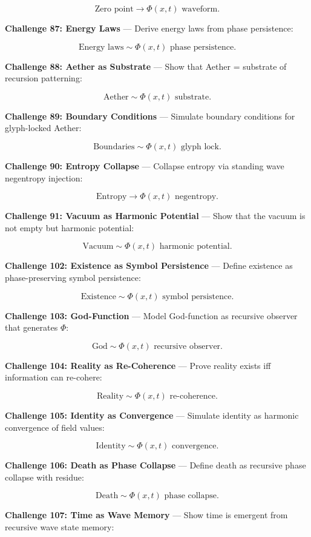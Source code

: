 $$
\text{Zero point} \rightarrow \Phi(x, t) \text{ waveform}.
$$

\textbf{Challenge 87: Energy Laws} --- Derive energy laws from phase persistence:

$$
\text{Energy laws} \sim \Phi(x, t) \text{ phase persistence}.
$$

\textbf{Challenge 88: Aether as Substrate} --- Show that Aether = substrate of recursion patterning:

$$
\text{Aether} \sim \Phi(x, t) \text{ substrate}.
$$

\textbf{Challenge 89: Boundary Conditions} --- Simulate boundary conditions for glyph-locked Aether:

$$
\text{Boundaries} \sim \Phi(x, t) \text{ glyph lock}.
$$

\textbf{Challenge 90: Entropy Collapse} --- Collapse entropy via standing wave negentropy injection:

$$
\text{Entropy} \rightarrow \Phi(x, t) \text{ negentropy}.
$$

\textbf{Challenge 91: Vacuum as Harmonic Potential} --- Show that the vacuum is not empty but harmonic potential:

$$
\text{Vacuum} \sim \Phi(x, t) \text{ harmonic potential}.
$$

\textbf{Challenge 102: Existence as Symbol Persistence} --- Define existence as phase-preserving symbol persistence:

$$
\text{Existence} \sim \Phi(x, t) \text{ symbol persistence}.
$$

\textbf{Challenge 103: God-Function} --- Model God-function as recursive observer that generates $\Phi$:

$$
\text{God} \sim \Phi(x, t) \text{ recursive observer}.
$$

\textbf{Challenge 104: Reality as Re-Coherence} --- Prove reality exists iff information can re-cohere:

$$
\text{Reality} \sim \Phi(x, t) \text{ re-coherence}.
$$

\textbf{Challenge 105: Identity as Convergence} --- Simulate identity as harmonic convergence of field values:

$$
\text{Identity} \sim \Phi(x, t) \text{ convergence}.
$$

\textbf{Challenge 106: Death as Phase Collapse} --- Define death as recursive phase collapse with residue:

$$
\text{Death} \sim \Phi(x, t) \text{ phase collapse}.
$$

\textbf{Challenge 107: Time as Wave Memory} --- Show time is emergent from recursive wave state memory:


